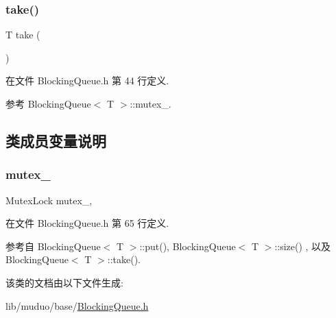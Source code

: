 \subsubsection{\texorpdfstring{take()}{take()}}
{\footnotesize\ttfamily T take (\begin{DoxyParamCaption}{ }\end{DoxyParamCaption})\hspace{0.3cm}{\ttfamily [inline]}}



在文件 Blocking\+Queue.\+h 第 44 行定义.



参考 Blocking\+Queue$<$ T $>$\+::mutex\+\_\+.



\subsection{类成员变量说明}
\mbox{\label{classmuduo_1_1BlockingQueue_a6e1bf1809a42f40f1a21178dc6620a6f}} 
\subsubsection{\texorpdfstring{mutex\+\_\+}{mutex\_}}
{\footnotesize\ttfamily Mutex\+Lock mutex\+\_\+\hspace{0.3cm}{\ttfamily [mutable]}, {\ttfamily [private]}}



在文件 Blocking\+Queue.\+h 第 65 行定义.



参考自 Blocking\+Queue$<$ T $>$\+::put(), Blocking\+Queue$<$ T $>$\+::size() , 以及 Blocking\+Queue$<$ T $>$\+::take().



该类的文档由以下文件生成\+:\begin{DoxyCompactItemize}
\item 
lib/muduo/base/\hyperlink{BlockingQueue_8h}{Blocking\+Queue.\+h}\end{DoxyCompactItemize}
